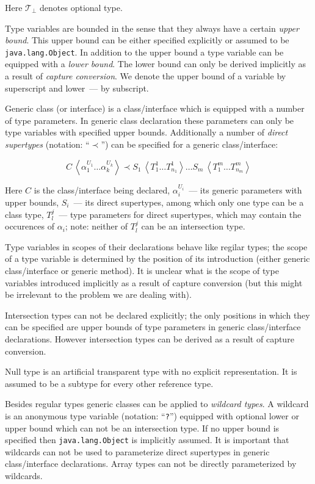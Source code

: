 \documentclass{article}
\newcommand{\grc}[2]{{#1}\,\left<{#2}\right>}
\newcommand{\java}[1]{\texttt{#1}}
\begin{document}
Here $\mathscr{T}_\bot$ denotes optional type.

Type variables are bounded in the sense that they always have a certain \emph{upper bound}. This upper
bound can be either specified explicitly or assumed to be \java{java.lang.Object}. In addition
to the upper bound a type variable can be equipped with a \emph{lower bound}. The lower bound can only
be derived implicitly as a result of \emph{capture conversion}. We denote the upper bound of a variable
by  superscript and lower~--- by subscript.

Generic class (or interface) is a class/interface which is equipped with a number of
type parameters. In generic class declaration these parameters can only be type
variables with specified upper bounds. Additionally a number of \emph{direct supertypes} (notation: ``$\prec$'')
can be specified for a generic class/interface:

\[
\grc{C}{\alpha_1^{U_1}\dots \alpha_k^{U_k}}\prec\grc{S_1}{T^1_1\dots T^1_{n_1}}\dots\grc{S_m}{T^m_1\dots T^m_{n_m}}
\]

Here $C$ is the class/interface being declared, $\alpha_i^{U_i}$~--- its generic parameters with upper
bounds, $S_i$~--- its direct supertypes, among which only one type can be a class type, $T^j_l$~--- type
parameters for direct supertypes, which may contain the occurences of $\alpha_i$; note: neither of $T^j_l$ can be
an intersection type.

Type variables in scopes of their declarations behave like regilar types; the scope of a type variable is
determined by the position of its introduction (either generic class/interface or generic method). It
is unclear what is the scope of type variables introduced implicitly as a result of capture
conversion (but this might be irrelevant to the problem we are dealing with).

Intersection types can not be declared explicitly; the only positions in which they can be specified are
upper bounds of type parameters in generic class/interface declarations. However intersection types can be derived
as a result of capture conversion.

Null type is an artificial transparent type with no explicit representation. It is assumed to be a subtype for
every other reference type.

Besides regular types generic classes can be applied to \emph{wildcard types}. A wildcard is an anonymous
type variable (notation: ``\java{?}'') equipped with optional lower or upper bound which can not be an intersection type.
If no upper bound is specified then \java{java.lang.Object} is implicitly assumed. It is important that wildcards can not 
be used to parameterize direct supertypes in generic class/interface declarations. Array types can not be directly
parameterized by wildcards.
\end{document}

